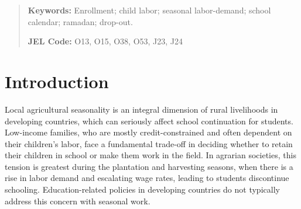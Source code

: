 \documentclass[12pt,letterpaper]{article}
\newcommand{\0}{\ensuremath{\mbox{\boldmath $0$}}}
\begin{document}
\begin{abstract}
{{\bf Keywords:} Enrollment; child labor; seasonal labor-demand; school calendar; ramadan; drop-out.

{\bf JEL Code:} O13, O15, O38, O53, J23, J24
\vspace{5em}}


\end{abstract}

\doublespacing

\pagebreak

\normalsize





\section{Introduction}




Local agricultural seasonality is an integral dimension of rural livelihoods in developing countries, which can seriously affect school continuation for students. Low-income families, who are mostly credit-constrained and often dependent on their children’s labor, face a fundamental trade-off in deciding whether to retain their children in school or make them work in the field. In agrarian societies, this tension is greatest during the plantation and harvesting seasons, when there is a rise in labor demand and escalating wage rates, leading to students discontinue schooling. Education-related policies in developing countries do not typically address this concern with seasonal work. 
\end{document}
